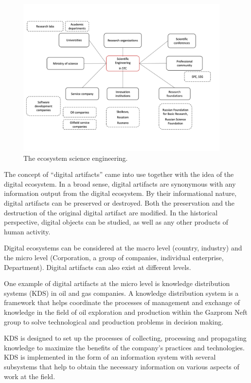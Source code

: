 \documentclass[12pt]{report}
\theoremstyle{definition}
\begin{document}
\begin{figure}[ht]

	\centering
	\includegraphics[width=0.95\textwidth]{se_eco_eng}
	\caption{The ecosystem science engineering.}
	\label{fig:om0}
\end{figure}

The concept of ``digital artifacts'' came into use together with the idea of the digital ecosystem. 
In a broad sense, digital artifacts are synonymous with any information output from the digital ecosystem. 
By their informational nature, digital artifacts can be preserved or destroyed. 
Both the preservation and the destruction of the original digital artifact are modified. In the historical perspective, digital objects can be studied, as well as any other products of human activity.

Digital ecosystems can be considered at the macro level (country, industry) and the micro level (Corporation, a group of companies, individual enterprise, Department). 
Digital artifacts can also exist at different levels.

One example of digital artifacts at the micro level is knowledge distribution systems (KDS) in oil and gas companies.
A knowledge distribution system is a framework that helps coordinate the processes of management and exchange of knowledge in the field of oil exploration and production within the Gazprom Neft group to solve technological and production problems in decision making.

KDS is designed to set up the processes of collecting, processing and propagating knowledge to maximize the benefits of the company's practices and technologies. 
KDS is implemented in the form of an information system with several subsystems that help to obtain the necessary information on various aspects of work at the field.
\end{document}
